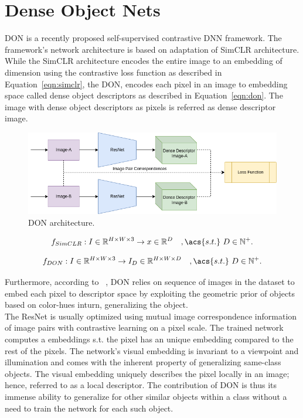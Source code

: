 \section{Dense Object Nets}

\ac{DON} is a recently proposed self-supervised contrastive \ac{DNN} framework.
The framework's network architecture is based on adaptation of SimCLR\cite{simclr} architecture.
While the SimCLR architecture encodes the entire image to an embedding of dimension using
the contrastive loss function as described in Equation~\ref{eqn:simclr}, the \ac{DON}, encodes each pixel in an image to embedding space called dense object descriptors as described in Equation~\ref{eqn:don}.
The image with dense object descriptors as pixels is referred as dense descriptor image.

\begin{figure}[htb]
    \centering
    \caption{\ac{DON} architecture.}
    \label{fig:don_architecture}
    \includegraphics[scale=0.4]{images/don/don_architecture.png}
\end{figure}

\begin{equation}
    \label{eqn:simclr}
    f_{SimCLR}:I \in \mathbb{R}^{H \times W \times 3} \rightarrow x \in \mathbb{R}^D \quad ,\acs{s.t.} \ D \in \mathbb{N}^+.
\end{equation}

\begin{equation}
    \label{eqn:don}
    f_{DON}:I \in \mathbb{R}^{H \times W \times 3} \rightarrow I_D \in \mathbb{R}^{H \times W \times D} \quad ,\acs{s.t.} \ D \in \mathbb{N}^+.
\end{equation}

Furthermore, according to \citeauthor{adrian2022efficient}~\cite{adrian2022efficient}, \ac{DON} relies on sequence of images in the dataset to embed each pixel
to descriptor space by exploiting the geometric prior of objects based on color-hues inturn, generalizing the object.\\

The \ac{ResNet} is usually optimized using mutual image correspondence information of image pairs with contrastive learning on a pixel scale.
The trained network computes a embeddings \ac{s.t.}
the pixel has an unique embedding compared to the rest of the pixels.
The network's visual embedding is invariant to a viewpoint and illumination and comes with the inherent property of generalizing same-class objects.
The visual embedding uniquely describes the pixel locally in an image; hence, referred to as a local descriptor.
The contribution of \ac{DON} is thus its immense ability to generalize for other similar objects within a class without a need to train the network for each such object.



